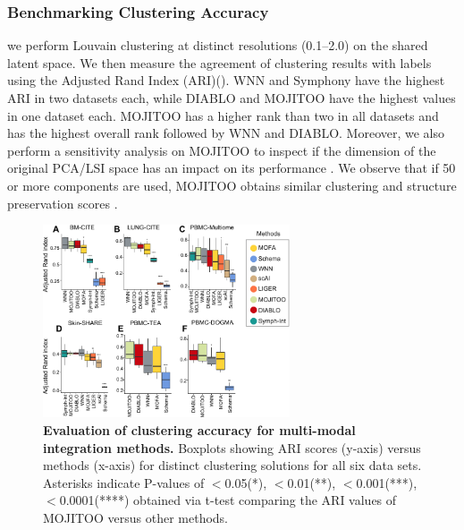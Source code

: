 \subsubsection{Benchmarking Clustering Accuracy}
we perform Louvain clustering at distinct resolutions (0.1–2.0) on the shared latent space. We then measure the agreement of clustering results with labels using the Adjusted Rand Index (ARI)(). WNN and Symphony have the highest ARI in two datasets each, while DIABLO and MOJITOO have the highest values in one dataset each. MOJITOO has a higher rank than two in all datasets and has the highest overall rank followed by WNN and DIABLO. Moreover, we also perform a sensitivity analysis on MOJITOO to inspect if the dimension of the original PCA/LSI space has an impact on its performance . We observe that if 50 or more components are used, MOJITOO obtains similar clustering and structure preservation scores .
\begin{figure}[!ht]
	\centering
	\includegraphics[width=0.65\textwidth]{ari/fig}
	\vspace{0.1cm}
	\caption[Evaluation of clustering accuracy for multi-modal integration methods.]{
	\textbf{Evaluation of clustering accuracy for multi-modal integration methods.} Boxplots showing ARI scores (y-axis) versus methods (x-axis) for distinct clustering solutions for all six data sets. Asterisks indicate P-values of $<$0.05(*), $<$0.01(**), $<$0.001(***), $<$0.0001(****) obtained via t-test comparing the ARI values of MOJITOO versus other methods. }
	\label{fig:ari}
\end{figure}

